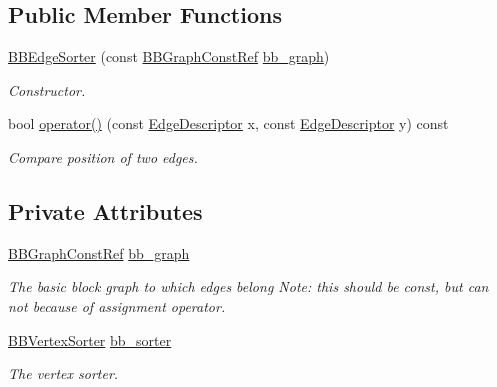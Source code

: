 \subsection*{Public Member Functions}
\begin{DoxyCompactItemize}
\item 
\hyperlink{classBBEdgeSorter_a2d5656a464a7b162837eb158912df806}{B\+B\+Edge\+Sorter} (const \hyperlink{basic__block_8hpp_ab66bdbde3a29e41d079d8a320af9c921}{B\+B\+Graph\+Const\+Ref} \hyperlink{classBBEdgeSorter_acc9c83f70d7b969748d9c2f8561f6e5c}{bb\+\_\+graph})
\begin{DoxyCompactList}\small\item\em Constructor. \end{DoxyCompactList}\item 
bool \hyperlink{classBBEdgeSorter_ab91b7b149bd5c6fcd69e321daef20459}{operator()} (const \hyperlink{graph_8hpp_a9eb9afea34e09f484b21f2efd263dd48}{Edge\+Descriptor} x, const \hyperlink{graph_8hpp_a9eb9afea34e09f484b21f2efd263dd48}{Edge\+Descriptor} y) const
\begin{DoxyCompactList}\small\item\em Compare position of two edges. \end{DoxyCompactList}\end{DoxyCompactItemize}
\subsection*{Private Attributes}
\begin{DoxyCompactItemize}
\item 
\hyperlink{basic__block_8hpp_ab66bdbde3a29e41d079d8a320af9c921}{B\+B\+Graph\+Const\+Ref} \hyperlink{classBBEdgeSorter_acc9c83f70d7b969748d9c2f8561f6e5c}{bb\+\_\+graph}
\begin{DoxyCompactList}\small\item\em The basic block graph to which edges belong Note\+: this should be const, but can not because of assignment operator. \end{DoxyCompactList}\item 
\hyperlink{classBBVertexSorter}{B\+B\+Vertex\+Sorter} \hyperlink{classBBEdgeSorter_aaee082ca57b91b1ff89f3d6e8740e144}{bb\+\_\+sorter}
\begin{DoxyCompactList}\small\item\em The vertex sorter. \end{DoxyCompactList}\end{DoxyCompactItemize}


